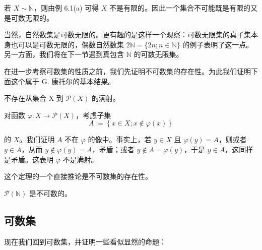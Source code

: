 \begin{remark}

若 $ X \sim \mathbb{N} $，则由例 6.1(a) 可得 $ X $ 不是有限的。因此一个集合不可能既是有限的又是可数无限的。

当然，自然数集是可数无限的。更有趣的是这样一个观察：可数无限集的真子集本身也可以是可数无限的，偶数自然数集 $ 2\mathbb{N} = \{2n; n \in \mathbb{N}\} $ 的例子表明了这一点。另一方面，我们将在下一节遇到真包含 $ \mathbb{N} $ 的可数无限集。

在进一步考察可数集的性质之前，我们先证明不可数集的存在性。为此我们证明下面这个属于 G. 康托尔的基本结果。

\end{remark}

\begin{theorem}

不存在从集合 X 到 $ \mathcal{P}(X) $ 的满射。

\proofhead
对函数 $ \varphi: X \to \mathcal{P}(X) $，考虑子集
\[
A:=\left\{x\in X;x\notin\varphi(x)\right\}
\]

的 $X$。我们证明 $A$ 不在 $\varphi$ 的像中。事实上，若 $y \in X$ 且 $\varphi(y) = A$，则或者 $y \in A$，从而 $y \notin \varphi(y) = A$，矛盾；或者 $y \notin A = \varphi(y)$，于是 $y \in A$，这同样是矛盾。这表明 $\varphi$ 不是满射。

这个定理的一个直接推论是不可数集的存在性。

\end{theorem}

\begin{corollary}

$ \mathcal{P}(\mathbb{N}) $ 是不可数的。

\end{corollary}

\subsection*{可数集}

现在我们回到可数集，并证明一些看似显然的命题：

